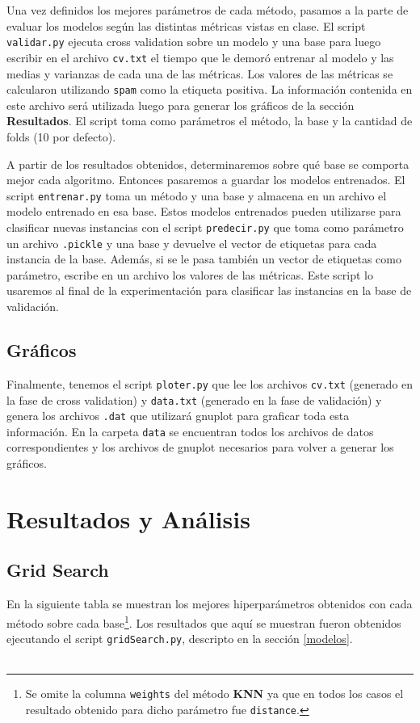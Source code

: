 \documentclass[10pt, a4paper]{article}
\begin{document}
Una vez definidos los mejores parámetros de cada método, pasamos a la parte de evaluar los modelos según las distintas métricas vistas en clase. El script \texttt{validar.py} ejecuta cross validation sobre un modelo y una base para luego escribir en el archivo \texttt{cv.txt} el tiempo que le demoró entrenar al modelo y las medias y varianzas de cada una de las métricas. Los valores de las métricas se calcularon utilizando \texttt{spam} como la etiqueta positiva. La información contenida en este archivo será utilizada luego para generar los gráficos de la sección \textbf{Resultados}. El script toma como parámetros el método, la base y la cantidad de folds (10 por defecto).

A partir de los resultados obtenidos, determinaremos sobre qué base se comporta mejor cada algoritmo. Entonces pasaremos a guardar los modelos entrenados. El script \texttt{entrenar.py} toma un método y una base y almacena en un archivo el modelo entrenado en esa base. Estos modelos entrenados pueden utilizarse para clasificar nuevas instancias con el script \texttt{predecir.py} que toma como parámetro un archivo \texttt{.pickle} y una base y devuelve el vector de etiquetas para cada instancia de la base. Además, si se le pasa también un vector de etiquetas como parámetro, escribe en un archivo los valores de las métricas. Este script lo usaremos al final de la experimentación para clasificar las instancias en la base de validación.

\subsection{Gráficos}

Finalmente, tenemos el script \texttt{ploter.py} que lee los archivos \texttt{cv.txt} (generado en la fase de cross validation) y \texttt{data.txt} (generado en la fase de validación) y genera los archivos \texttt{.dat} que utilizará gnuplot para graficar toda esta información. En la carpeta \texttt{data} se encuentran todos los archivos de datos correspondientes y los archivos de gnuplot necesarios para volver a generar los gráficos.

\section{Resultados y Análisis}

\subsection{Grid Search}
En la siguiente tabla se muestran los mejores hiperparámetros obtenidos con cada método sobre cada base\footnote{Se omite la columna \texttt{weights} del método \textbf{KNN} ya que en todos los casos el resultado obtenido para dicho parámetro fue \texttt{distance}.}. Los resultados que aquí se muestran fueron obtenidos ejecutando el script \texttt{gridSearch.py}, descripto en la sección \ref{modelos}.
\\\\
\end{document}

